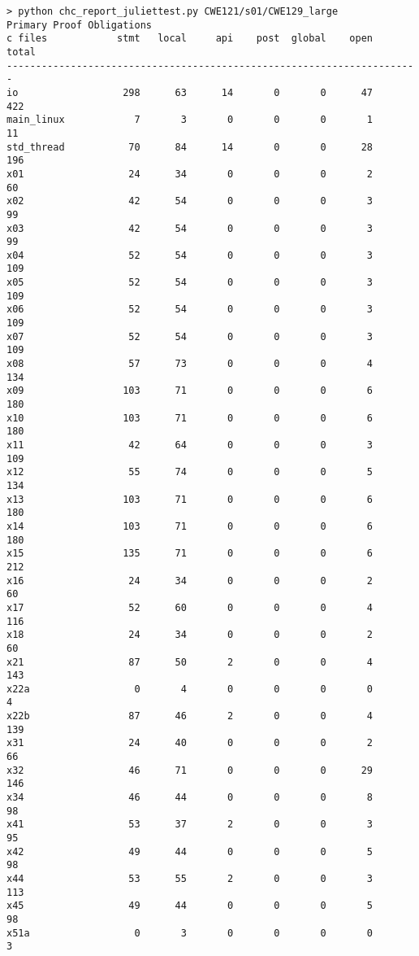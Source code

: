 \documentclass[11pt]{article}
\begin{document}
\begin{scriptsize}
\begin{verbatim}
> python chc_report_juliettest.py CWE121/s01/CWE129_large
Primary Proof Obligations
c files            stmt   local     api    post  global    open   total
-----------------------------------------------------------------------
io                  298      63      14       0       0      47     422
main_linux            7       3       0       0       0       1      11
std_thread           70      84      14       0       0      28     196
x01                  24      34       0       0       0       2      60
x02                  42      54       0       0       0       3      99
x03                  42      54       0       0       0       3      99
x04                  52      54       0       0       0       3     109
x05                  52      54       0       0       0       3     109
x06                  52      54       0       0       0       3     109
x07                  52      54       0       0       0       3     109
x08                  57      73       0       0       0       4     134
x09                 103      71       0       0       0       6     180
x10                 103      71       0       0       0       6     180
x11                  42      64       0       0       0       3     109
x12                  55      74       0       0       0       5     134
x13                 103      71       0       0       0       6     180
x14                 103      71       0       0       0       6     180
x15                 135      71       0       0       0       6     212
x16                  24      34       0       0       0       2      60
x17                  52      60       0       0       0       4     116
x18                  24      34       0       0       0       2      60
x21                  87      50       2       0       0       4     143
x22a                  0       4       0       0       0       0       4
x22b                 87      46       2       0       0       4     139
x31                  24      40       0       0       0       2      66
x32                  46      71       0       0       0      29     146
x34                  46      44       0       0       0       8      98
x41                  53      37       2       0       0       3      95
x42                  49      44       0       0       0       5      98
x44                  53      55       2       0       0       3     113
x45                  49      44       0       0       0       5      98
x51a                  0       3       0       0       0       0       3

\end{verbatim}
\end{scriptsize}
\end{document}
